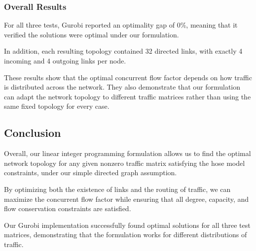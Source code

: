 \documentclass[11pt]{article}
\theoremstyle{definition}
\begin{document}
\subsubsection{Overall Results}

For all three tests, Gurobi reported an optimality gap of 0\%, meaning that it verified the solutions were optimal under our formulation.

In addition, each resulting topology contained 32 directed links, with exactly 4 incoming and 4 outgoing links per node.

These results show that the optimal concurrent flow factor depends on how traffic is distributed across the network. They also demonstrate that our formulation can adapt the network topology to different traffic matrices rather than using the same fixed topology for every case.

\subsection{Conclusion}

Overall, our linear integer programming formulation allows us to find the optimal network topology for any given nonzero traffic matrix satisfying the hose model constraints, under our simple directed graph assumption.

By optimizing both the existence of links and the routing of traffic, we can maximize the concurrent flow factor while ensuring that all degree, capacity, and flow conservation constraints are satisfied.

Our Gurobi implementation successfully found optimal solutions for all three test matrices, demonstrating that the formulation works for different distributions of traffic.
\end{document}
